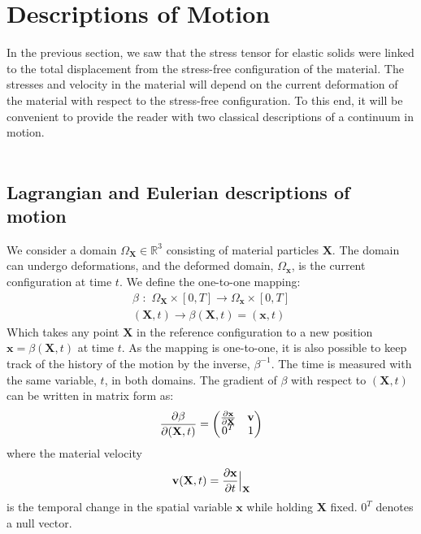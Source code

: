 \section{Descriptions of Motion} \label{sec:DoM}
In the previous section, we saw that the stress tensor for elastic solids were linked to the total displacement from the stress-free configuration of the material. The stresses and velocity in the material will depend on the current deformation of the material with respect to the stress-free configuration. To this end, it will be convenient to provide the reader with two classical descriptions of a continuum in motion. 
\\
\\
\subsection{Lagrangian and Eulerian descriptions of motion}
We consider a domain $\Omega_{\mathbf{X}} \in \mathbb{R}^3$ consisting of material particles $\mathbf{X}$. The domain can undergo deformations, and the deformed domain, $\Omega_{\mathbf{x}}$, is the current configuration at time $t$. We define the one-to-one mapping:
\begin{align}
\beta \,\, : \,\, \Omega_{\mathbf{X}} \times [0,T] \rightarrow  \Omega_{\mathbf{x}} \times [0,T] \\
(\mathbf{X},t) \rightarrow \beta(\mathbf{X},t) = (\mathbf{x},t)
\end{align}
Which takes any point $\mathbf{X}$ in the reference configuration to a new position $\mathbf{x} = \beta(\mathbf{X},t)$ at time $t$. As the mapping is one-to-one, it is also possible to keep track of the history of the motion by the inverse, $\beta^{-1}$. The time is measured with the same variable, $t$, in both domains. The gradient of $\beta$ with respect to $(\mathbf{X},t)$ can be written in matrix form as:
\begin{align}
\frac{\partial \beta}{\partial (\mathbf{X},t)} = \begin{pmatrix} \frac{\partial \mathbf{x}}{\partial \mathbf{X}} & \mathbf{v} \\
											0^T & 1
								\end{pmatrix} \label{betaGradient}
\end{align}
where the material velocity
\begin{align} \mathbf{v}(\mathbf{X},t) = \frac{\partial \mathbf{x}}{\partial t}\Big{|}_{\mathbf{X}} \label{MatVel}
\end{align}
is the temporal change in the spatial variable $\mathbf{x}$ while holding \textbf{X} fixed. $0^T$ denotes a null vector. 
